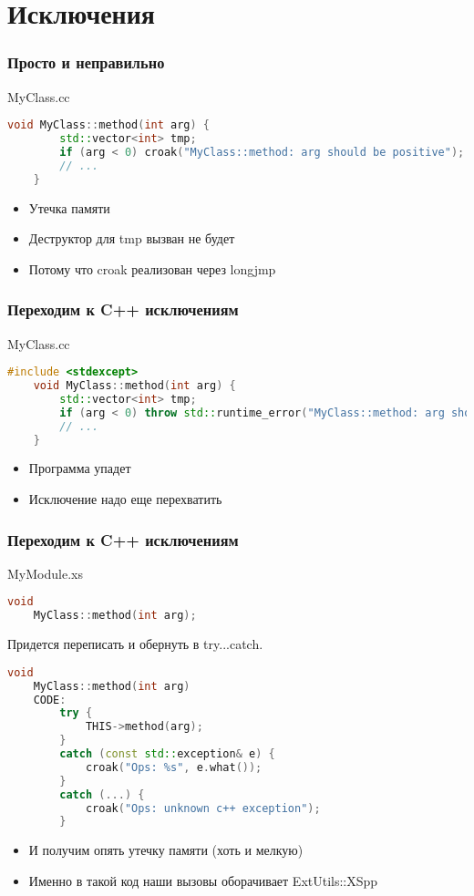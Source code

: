 \documentclass[utf8x,smaller]{beamer}
\begin{document}
\section{Исключения}

\begin{frame}[fragile]
    \frametitle{Просто и неправильно}
    MyClass.cc
    \begin{lstlisting}[language=C++,style=PerlXS]
    void MyClass::method(int arg) {
        std::vector<int> tmp;
        if (arg < 0) croak("MyClass::method: arg should be positive");
        // ...
    }
    \end{lstlisting}
    \begin{itemize}
        \item \alert{Утечка} памяти
        \item Деструктор для tmp вызван не будет
        \item Потому что croak реализован через longjmp
    \end{itemize}
\end{frame}

\begin{frame}[fragile]
    \frametitle{Переходим к C++ исключениям}
    MyClass.cc
    \begin{lstlisting}[language=C++,style=PerlXS]
    #include <stdexcept>
    void MyClass::method(int arg) {
        std::vector<int> tmp;
        if (arg < 0) throw std::runtime_error("MyClass::method: arg should be positive");
        // ...
    }
    \end{lstlisting}
    \begin{itemize}
        \item Программа упадет
        \item Исключение надо еще перехватить
    \end{itemize}
\end{frame}

\begin{frame}[fragile]
    \frametitle{Переходим к C++ исключениям}
    MyModule.xs
    \begin{lstlisting}[language=C++,style=PerlXS]
    void
    MyClass::method(int arg);
    \end{lstlisting}
    Придется переписать и обернуть в try...catch.
    \begin{lstlisting}[language=C++,style=PerlXS]
    void
    MyClass::method(int arg)
    CODE:
        try {
            THIS->method(arg);
        }
        catch (const std::exception& e) {
            croak("Ops: %s", e.what());
        }
        catch (...) {
            croak("Ops: unknown c++ exception");
        }
    \end{lstlisting}
    \begin{itemize}
        \item<2-| alert@2> И получим опять утечку памяти (хоть и мелкую)
        \item<3-> Именно в такой код наши вызовы оборачивает ExtUtils::XSpp
    \end{itemize}
\end{frame}
\end{document}
